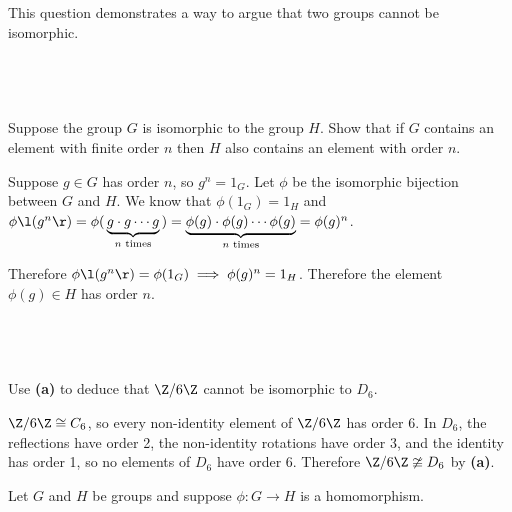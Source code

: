 \documentclass[a4paper]{article}
\begin{document}
\renewcommand{\thesubsection}{Q\arabic{section}~(\alph{subsection})}

\begin{questionbody}
This question demonstrates a way to argue that two groups cannot be isomorphic.
\end{questionbody}

\subsection{~} %

\begin{questionbody}
Suppose the group $G$ is isomorphic to the group $H$. Show that if $G$ contains an element with finite order $n$ then $H$ also contains an element with order $n$.
\end{questionbody}

Suppose $g \in G$ has order $n$, so $g^n = 1_G$. Let $\phi$ be the isomorphic bijection between $G$ and $H$. We know that $\phi(1_G) = 1_H$ and $\phi\l(g^n\r) = \phi(\, \underbrace{g \cdot g \cdots g}_{n \text{ times}} \,) = \underbrace{\phi(g) \cdot \phi(g) \cdots \phi(g)}_{n \text{ times}} = \phi(g)^n$.

Therefore $\phi\l( g^n \r) = \phi(1_G) \implies \phi(g)^n = 1_H$. Therefore the element $\phi(g) \in H$ has order $n$.

\subsection{~} %

\begin{questionbody}
Use \textbf{(a)} to deduce that $\Z / 6\Z$ cannot be isomorphic to $D_6$.
\end{questionbody}

$\Z / 6\Z \cong C_6$, so every non-identity element of $\Z / 6\Z$ has order 6. In $D_6$, the reflections have order 2, the non-identity rotations have order 3, and the identity has order 1, so no elements of $D_6$ have order 6. Therefore $\Z / 6\Z \ncong D_6$ by \textbf{(a)}.


\begin{questionbody}
Let $G$ and $H$ be groups and suppose $\phi : G \to H$ is a homomorphism.
\end{questionbody}

\subsection{~} %
\end{document}
